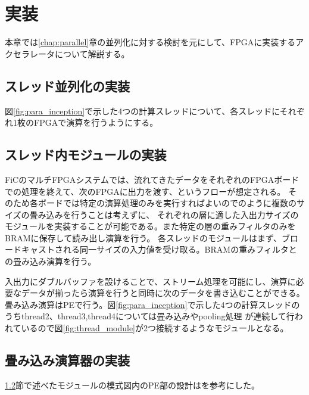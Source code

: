 \chapter{実装}
{
\label{chap:implement}
本章では\ref{chap:parallel}章の並列化に対する検討を元にして、FPGAに実装するアクセラレータについて解説する。
\section{スレッド並列化の実装}
\label{sec:thread_impl}
図\ref{fig:para_inception}で示した4つの計算スレッドについて、各スレッドにそれぞれ1枚のFPGAで演算を行うようにする。

\section{スレッド内モジュールの実装}
\label{sec:module_impl}
FiCのマルチFPGAシステムでは、流れてきたデータをそれぞれのFPGAボードでの処理を終えて、次のFPGAに出力を渡す、というフローが想定される。
そのため各ボードでは特定の演算処理のみを実行すればよいので\cite{optimized}のように複数のサイズの畳み込みを行うことは考えずに、
それぞれの層に適した入出力サイズのモジュールを実装することが可能である。また特定の層の重みフィルタのみをBRAMに保存して読み出し演算を行う。
各スレッドのモジュールはまず、ブロードキャストされる同一サイズの入力値を受け取る。BRAMの重みフィルタとの畳み込み演算を行う。


入出力にダブルバッファを設けることで、ストリーム処理を可能にし、演算に必要なデータが揃ったら演算を行うと同時に次のデータを書き込むことができる。
畳み込み演算はPEで行う。図\ref{fig:para_inception}で示した4つの計算スレッドのうちthread2、thread3,thread4については畳み込みやpooling処理
が連続して行われているので図\ref{fig:thread_module}が2つ接続するようなモジュールとなる。

\section{畳み込み演算器の実装}
\label{sec:conv_impl}
\ref{sec:module_impl}節で述べたモジュールの模式図内のPE部の設計は\cite{optimized}を参考にした。

}

